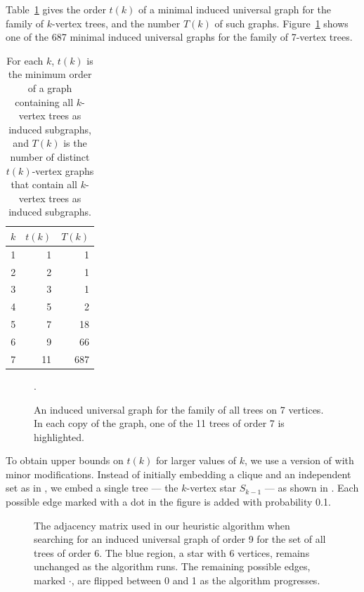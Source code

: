 Table~\ref{tab:treeresults} gives the order $t(k)$ of a minimal induced universal graph for
the family of $k$-vertex trees, and the number $T(k)$ of such graphs.  Figure~\ref{fig:tree-example}
shows one of the 687 minimal induced universal graphs for the family of 7-vertex trees.

\begin{table}[h!]
\centering
\begin{tabular}{r r r}
 \toprule
 $k$ & $t(k)$ & $T(k)$ \\ [0.5ex]
 \midrule
 1 & 1 & 1 \\
 2 & 2 & 1 \\
 3 & 3 & 1 \\
 4 & 5 & 2 \\
 5 & 7 & 18 \\
 6 & 9 & 66 \\
 7 & 11 & 687 \\
 \bottomrule
\end{tabular}
\caption{For each $k$, $t(k)$ is the minimum order of a graph containing all $k$-vertex trees as
induced subgraphs, and $T(k)$ is the number of distinct $t(k)$-vertex graphs that contain
all $k$-vertex trees as induced subgraphs.}
\label{tab:treeresults}
\end{table}

\begin{figure}[htb]
    \centering
    
\caption{An induced universal graph for the family of all
    trees on 7 vertices.  In each copy of the graph, one of the
    11 trees of order 7 is highlighted.}.
\label{fig:tree-example}
\end{figure}

To obtain upper bounds on $t(k)$ for larger values of $k$, we use a version of
 with minor modifications.  Instead of initially embedding
a clique and an independent set as in , we embed
a single tree --- the $k$-vertex star $S_{k-1}$ --- as shown in
.  Each possible edge marked with a dot
in the figure is added with probability 0.1.

\begin{figure}[h!]
    \centering
    \footnotesize
    \caption{The adjacency matrix used in our heuristic algorithm when searching
        for an induced universal graph of order 9 for the set of all trees
        of order 6.  The blue
        region, a star with 6 vertices, remains unchanged as the algorithm runs.
        The remaining possible edges, marked $\boldsymbol{\cdot}$,
        are flipped between 0 and 1 as the algorithm progresses.}
\label{fig:heuristic-regions-for-trees}
\end{figure}


